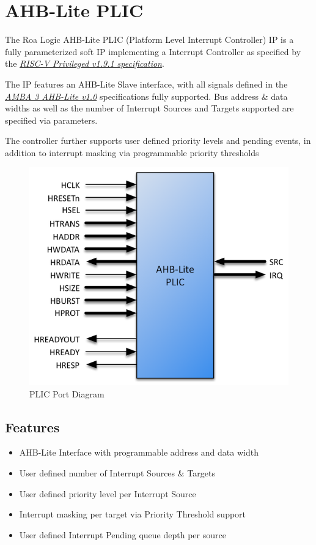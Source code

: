 \section{AHB-Lite PLIC}

The Roa Logic AHB-Lite PLIC (Platform Level Interrupt Controller) IP is a fully parameterized soft IP implementing a Interrupt Controller as specified by the \emph{\href{https://people.eecs.berkeley.edu/\%7Ekrste/papers/riscv-privileged-v1.9.1.pdf}{RISC-V Privileged v1.9.1 specification}}.

The IP features an AHB-Lite Slave interface, with all signals defined in the \emph{\href{https://www.arm.com/products/system-ip/amba-specifications}{AMBA 3 AHB-Lite v1.0}} specifications fully supported. Bus address \& data widths as well as the number of Interrupt Sources and Targets supported are specified via parameters.

The controller further supports user defined priority levels and pending events, in addition to interrupt masking via programmable priority thresholds

\begin{figure}[h]
  \includegraphics{../assets/graphics/AHB-Lite_PLIC_Port_Diagram.png}
  \caption{PLIC Port Diagram}
  \label{fig:PORTDIAG}
\end{figure}

\subsection{Features}

\begin{itemize}
\item
  AHB-Lite Interface with programmable address and data width
\item
  User defined number of Interrupt Sources \& Targets
\item
  User defined priority level per Interrupt Source
\item
  Interrupt masking per target via Priority Threshold support
\item
  User defined Interrupt Pending queue depth per source
\end{itemize}